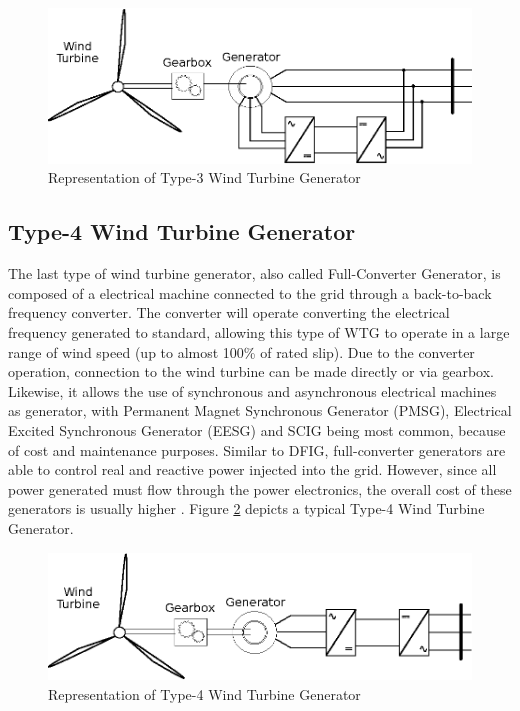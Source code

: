 \begin{figure}[h]
	\caption{Representation of Type-3 Wind Turbine Generator}
	\begin{center}
		\includegraphics[scale=1]{Images/Type3WTG.eps}
	\end{center}
	\label{fig: WTG3}
\end{figure}

\subsection{Type-4 Wind Turbine Generator}

The last type of wind turbine generator, also called Full-Converter Generator, is composed of a electrical machine connected to the grid through a back-to-back frequency converter. The converter will operate converting the electrical frequency generated to standard, allowing this type of WTG to operate in a large range of wind speed (up to almost 100\% of rated slip). Due to the converter operation, connection to the wind turbine can be made directly or via gearbox. Likewise, it allows the use of synchronous and asynchronous electrical machines as generator, with Permanent Magnet Synchronous Generator (PMSG), Electrical Excited Synchronous Generator (EESG) and SCIG being most common, because of cost and maintenance purposes. Similar to DFIG, full-converter generators are able to control real and reactive power injected into the grid. However, since all power generated must flow through the power electronics, the overall cost of these generators is usually higher \cite{Yaramasu2015}. Figure \ref{fig: WTG4} depicts a typical Type-4 Wind Turbine Generator.

\begin{figure}[h]
	\caption{Representation of Type-4 Wind Turbine Generator}
	\begin{center}
		\includegraphics[scale=1]{Images/Type4WTG.eps}
	\end{center}
	\label{fig: WTG4}
\end{figure}

